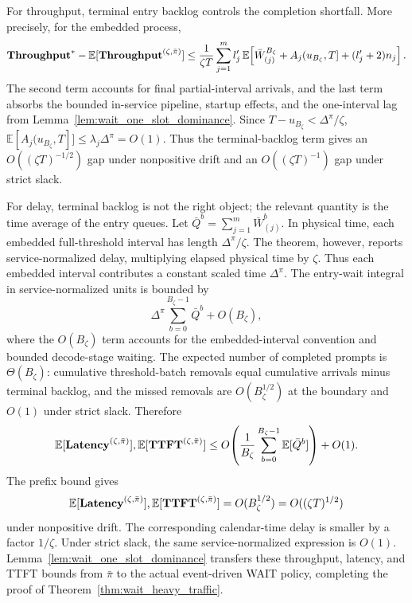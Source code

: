 For throughput, terminal entry backlog controls the completion shortfall. More precisely, for the embedded process,
\[
    \textbf{Throughput}^*-\mathbb{E}[\textbf{Throughput}^{(\zeta,\bar\pi)}]
    \le
    \frac{1}{\zeta T}\sum_{j=1}^m l_j^\prime\,
    \mathbb{E}\!\left[
    \bar W^{B_\zeta}_{(j)}
    +A_j(u_{B_\zeta},T]
    +(l_j^\prime+2)n_j
    \right].
\]
The second term accounts for final partial-interval arrivals, and the last term absorbs the bounded in-service pipeline, startup effects, and the one-interval lag from Lemma~\ref{lem:wait_one_slot_dominance}. Since \(T-u_{B_\zeta}<\Delta^\pi/\zeta\), \(\mathbb{E}[A_j(u_{B_\zeta},T]]\le \lambda_j\Delta^\pi=O(1)\). Thus the terminal-backlog term gives an \(O((\zeta T)^{-1/2})\) gap under nonpositive drift and an \(O((\zeta T)^{-1})\) gap under strict slack.

For delay, terminal backlog is not the right object; the relevant quantity is the time average of the entry queues. Let \(\bar Q^b=\sum_{j=1}^m \bar W^b_{(j)}\). In physical time, each embedded full-threshold interval has length \(\Delta^\pi/\zeta\). The theorem, however, reports service-normalized delay, multiplying elapsed physical time by \(\zeta\). Thus each embedded interval contributes a constant scaled time \(\Delta^\pi\). The entry-wait integral in service-normalized units is bounded by
\[
    \Delta^\pi\sum_{b=0}^{B_\zeta-1}\bar Q^b+O(B_\zeta),
\]
where the \(O(B_\zeta)\) term accounts for the embedded-interval convention and bounded decode-stage waiting. The expected number of completed prompts is \(\Theta(B_\zeta)\): cumulative threshold-batch removals equal cumulative arrivals minus terminal backlog, and the missed removals are \(O(B_\zeta^{1/2})\) at the boundary and \(O(1)\) under strict slack. Therefore
\[
    \mathbb{E}[\textbf{Latency}^{(\zeta,\bar\pi)}],
    \mathbb{E}[\textbf{TTFT}^{(\zeta,\bar\pi)}]
    \le
    O\!\left(
    \frac{1}{B_\zeta}\sum_{b=0}^{B_\zeta-1}
    \mathbb{E}[\bar Q^b]
    \right)+O(1).
\]
The prefix bound gives
\[
    \mathbb{E}[\textbf{Latency}^{(\zeta,\bar\pi)}],
    \mathbb{E}[\textbf{TTFT}^{(\zeta,\bar\pi)}]
    =
    O(B_\zeta^{1/2})
    =
    O((\zeta T)^{1/2})
\]
under nonpositive drift. The corresponding calendar-time delay is smaller by a factor \(1/\zeta\). Under strict slack, the same service-normalized expression is \(O(1)\). Lemma~\ref{lem:wait_one_slot_dominance} transfers these throughput, latency, and TTFT bounds from \(\bar\pi\) to the actual event-driven WAIT policy, completing the proof of Theorem~\ref{thm:wait_heavy_traffic}.
